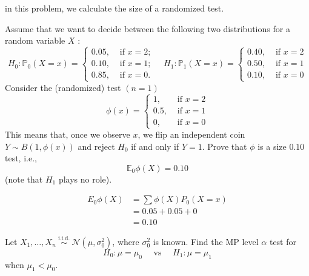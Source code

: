 \begin{ex}
     in this problem, we calculate the size of a randomized test. 

    Assume that we want to decide between the following two distributions for a random variable \(X\) :
    \[
        H_{0}: \mathbb{P}_{0}(X=x)=\left\{\begin{array}{ll}
        0.05, & \text { if } x=2 ; \\
        0.10, & \text { if } x=1 ; \\
        0.85, & \text { if } x=0 .
        \end{array} \quad H_{1}: \mathbb{P}_{1}(X=x)= \begin{cases}0.40, & \text { if } x=2 \\
        0.50, & \text { if } x=1 \\
        0.10, & \text { if } x=0\end{cases}\right.
    \]
    Consider the (randomized) test \((n=1)\)
    \[
        \phi(x)=\left\{\begin{array}{cl}
        1, & \text { if } x=2 \\
        0.5, & \text { if } x=1 \\
        0, & \text { if } x=0
        \end{array}\right.
    \]
    This means that, once we observe \(x\), we flip an independent coin \(Y \sim B(1, \phi(x))\) and reject \(H_{0}\) if and only if \(Y=1\). Prove that \(\phi\) is a size \(0.10\) test, i.e.,
    \[
        \mathbb{E}_{0} \phi(X)=0.10
    \]
    (note that \(H_{1}\) plays no role). 
\end{ex}

\begin{solution}
    \begin{align*}
        E_0\phi(X)&=\sum \phi(X) P_0(X=x)\\
        &=0.05+0.05+0\\
        &=0.10
    \end{align*}
\end{solution}

\begin{ex}
    Let \(X_{1}, \ldots, X_{n} \stackrel{\text { i.i.d. }}{\sim} \mathcal{N}\left(\mu, \sigma_{0}^{2}\right)\), where \(\sigma_{0}^{2}\) is known. Find the MP level \(\alpha\) test for
    \[
        H_{0}: \mu=\mu_{0} \quad \text { vs } \quad H_{1}: \mu=\mu_{1}
    \]
    when \(\mu_{1}<\mu_{0}\). 
\end{ex}

